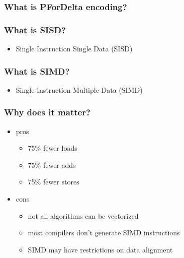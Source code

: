 \documentclass{beamer}
\begin{document}
  	\begin{frame}
  		\frametitle{What is PForDelta encoding?}
  		
  	\end{frame}
  	\begin{frame}
    		\frametitle{What is SISD?}
    		\begin{itemize}
    		    \item Single Instruction Single Data (SISD)
		\end{itemize}
  	\end{frame}
  	\begin{frame}
    		\frametitle{What is SIMD?}
    		\begin{itemize}
    		    \item Single Instruction Multiple Data (SIMD)
		\end{itemize}
  	\end{frame}
  	\begin{frame}
    		\frametitle{Why does it matter?}
    		\begin{itemize}
    		    \item pros
    		    \begin{itemize}
    		    		\item 75\% fewer loads
    		    		\item 75\% fewer adds
    		    		\item 75\% fewer stores
    		    \end{itemize}
    		    \item cons
    		    \begin{itemize}
    		    		\item not all algorithms can be vectorized
    		    		\item most compilers don't generate SIMD instructions
    		    		\item SIMD may have restrictions on data alignment
    		    \end{itemize}
		\end{itemize}
  	\end{frame}  	
  	
\end{document}
